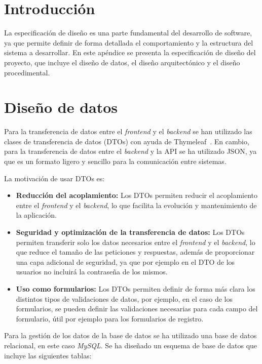 
\section{Introducción}
La especificación de diseño es una parte fundamental del desarrollo de software, ya que permite definir de forma detallada el comportamiento y la estructura del sistema a desarrollar. En este apéndice se presenta la especificación de diseño del proyecto, que incluye el diseño de datos, el diseño arquitectónico y el diseño procedimental.

\section{Diseño de datos}
Para la transferencia de datos entre el \textit{frontend} y el \textit{backend} se han utilizado las clases de transferencia de datos (DTOs) con ayuda de Thymeleaf~\cite{Thymeleaf}. En cambio, para la transferencia de datos entre el \textit{backend} y la API se ha utilizado JSON, ya que es un formato ligero y sencillo para la comunicación entre sistemas.

La motivación de usar DTOs es:
\begin{itemize}
    \item \textbf{Reducción del acoplamiento:} Los DTOs permiten reducir el acoplamiento entre el \textit{frontend} y el \textit{backend}, lo que facilita la evolución y mantenimiento de la aplicación.
    \item \textbf{Seguridad y optimización de la transferencia de datos:} Los DTOs permiten transferir solo los datos necesarios entre el \textit{frontend} y el \textit{backend}, lo que reduce el tamaño de las peticiones y respuestas, además de proporcionar una capa adicional de seguridad, ya que por ejemplo en el DTO de los usuarios no incluirá la contraseña de los mismos.
    \item \textbf{Uso como formularios:} Los DTOs permiten definir de forma más clara los distintos tipos de validaciones de datos, por ejemplo, en el caso de los formularios, se pueden definir las validaciones necesarias para cada campo del formulario, útil por ejemplo para los formularios de registro.
\end{itemize}





Para la gestión de los datos de la base de datos se ha utilizado una base de datos relacional, en este caso \textit{MySQL}. Se ha diseñado un esquema de base de datos que incluye las siguientes tablas:

